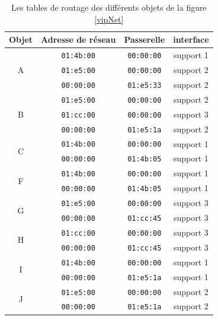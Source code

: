 			\begin{table}[!ht]
				\centering
				\begin{tabular}{|c|c|c|c|}
					\hline
					Objet              & Adresse de réseau & Passerelle        & interface \\ 
					\hline\hline
					\multirow{3}{*}{A} & \texttt{01:4b:00} & \texttt{00:00:00} & support 1 \\
					                   & \texttt{01:e5:00} & \texttt{00:00:00} & support 2 \\
					                   & \texttt{00:00:00} & \texttt{01:e5:33} & support 2 \\ \hline
					\multirow{3}{*}{B} & \texttt{01:e5:00} & \texttt{00:00:00} & support 2 \\
					                   & \texttt{01:cc:00} & \texttt{00:00:00} & support 3 \\
					                   & \texttt{00:00:00} & \texttt{01:e5:1a} & support 2 \\ \hline
					\multirow{2}{*}{C} & \texttt{01:4b:00} & \texttt{00:00:00} & support 1 \\
					                   & \texttt{00:00:00} & \texttt{01:4b:05} & support 1 \\ \hline
					\multirow{2}{*}{F} & \texttt{01:4b:00} & \texttt{00:00:00} & support 1 \\
					                   & \texttt{00:00:00} & \texttt{01:4b:05} & support 1 \\ \hline
					\multirow{2}{*}{G} & \texttt{01:e5:00} & \texttt{00:00:00} & support 3 \\
					                   & \texttt{00:00:00} & \texttt{01:cc:45} & support 3 \\ \hline
					\multirow{2}{*}{H} & \texttt{01:cc:00} & \texttt{00:00:00} & support 3 \\
					                   & \texttt{00:00:00} & \texttt{01:cc:45} & support 3 \\ \hline
					\multirow{2}{*}{I} & \texttt{01:4b:00} & \texttt{00:00:00} & support 1 \\
					                   & \texttt{00:00:00} & \texttt{01:e5:1a} & support 1 \\ \hline
					\multirow{2}{*}{J} & \texttt{01:e5:00} & \texttt{00:00:00} & support 2 \\
					                   & \texttt{00:00:00} & \texttt{01:e5:1a} & support 2 \\ \hline
				\end{tabular}
				\caption{Les tables de routage des différents objets de la figure \ref{vipNet}}
				\label{routingTable}
			\end{table}

